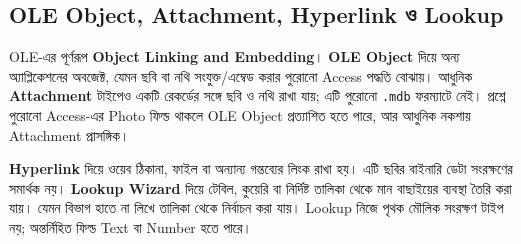 \subsection{OLE Object, Attachment, Hyperlink ও Lookup}
OLE-এর পূর্ণরূপ \textbf{Object Linking and Embedding}। \textbf{OLE Object} দিয়ে অন্য অ্যাপ্লিকেশনের অবজেক্ট, যেমন ছবি বা নথি সংযুক্ত/এম্বেড করার পুরোনো Access পদ্ধতি বোঝায়। আধুনিক \textbf{Attachment} টাইপেও একটি রেকর্ডের সঙ্গে ছবি ও নথি রাখা যায়; এটি পুরোনো \texttt{.mdb} ফরম্যাটে নেই। প্রশ্নে পুরোনো Access-এর Photo ফিল্ড থাকলে OLE Object প্রত্যাশিত হতে পারে, আর আধুনিক নকশায় Attachment প্রাসঙ্গিক।

\textbf{Hyperlink} দিয়ে ওয়েব ঠিকানা, ফাইল বা অন্যান্য গন্তব্যের লিংক রাখা হয়। এটি ছবির বাইনারি ডেটা সংরক্ষণের সমার্থক নয়। \textbf{Lookup Wizard} দিয়ে টেবিল, কুয়েরি বা নির্দিষ্ট তালিকা থেকে মান বাছাইয়ের ব্যবস্থা তৈরি করা যায়। যেমন বিভাগ হাতে না লিখে তালিকা থেকে নির্বাচন করা যায়। Lookup নিজে পৃথক মৌলিক সংরক্ষণ টাইপ নয়; অন্তর্নিহিত ফিল্ড Text বা Number হতে পারে।


